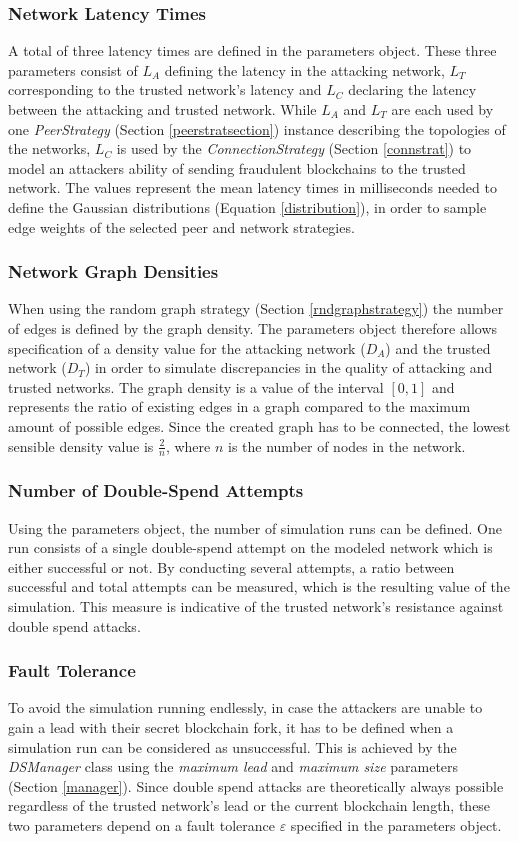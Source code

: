 \documentclass[a4paper,12pt,twoside]{report}
\begin{document}
\subsubsection{Network Latency Times}
A total of three latency times are defined in the parameters object. These three parameters consist of $L_A$ defining the latency in the attacking network, $L_T$ corresponding to the trusted network's latency and $L_C$ declaring the latency between the attacking and trusted network. While $L_A$ and $L_T$ are each used by one \textit{PeerStrategy} (Section \ref{peerstratsection}) instance describing the topologies of the networks, $L_C$ is used by the \textit{ConnectionStrategy} (Section \ref{connstrat}) to model an attackers ability of sending fraudulent blockchains to the trusted network. The values represent the mean latency times in milliseconds needed to define the Gaussian distributions (Equation \ref{distribution}), in order to sample edge weights of the selected peer and network strategies.
\subsubsection{Network Graph Densities}
When using the random graph strategy (Section \ref{rndgraphstrategy}) the number of edges is defined by the graph density. The parameters object therefore allows specification of a density value for the attacking network ($D_A$) and the trusted network ($D_T$) in order to simulate discrepancies in the quality of attacking and trusted networks. The graph density is a value of the interval $[0,1]$ and represents the ratio of existing edges in a graph compared to the maximum amount of possible edges. Since the created graph has to be connected, the lowest sensible density value is $\frac{2}{n}$, where $n$ is the number of nodes in the network.
\subsubsection{Number of Double-Spend Attempts}
Using the parameters object, the number of simulation runs can be defined. One run consists of a single double-spend attempt on the modeled network which is either successful or not. By conducting several attempts, a ratio between successful and total attempts can be measured, which is the resulting value of the simulation. This measure is indicative of the trusted network's resistance against double spend attacks.
\subsubsection{Fault Tolerance}\label{faulttolerance}
To avoid the simulation running endlessly, in case the attackers are unable to gain a lead with their secret blockchain fork, it has to be defined when a simulation run can be considered as unsuccessful. This is achieved by the \textit{DSManager} class using the \textit{maximum lead} and \textit{maximum size} parameters (Section \ref{manager}). Since double spend attacks are theoretically always possible regardless of the trusted network's lead or the current blockchain length, these two parameters depend on a fault tolerance $\varepsilon$ specified in the parameters object.
\end{document}

